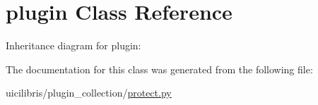 \hypertarget{classplugin}{\section{plugin \-Class \-Reference}
\label{classplugin}
}


\-Inheritance diagram for plugin\-:


\-The documentation for this class was generated from the following file\-:\begin{DoxyCompactItemize}
\item 
uicilibris/plugin\-\_\-collection/\hyperlink{protect_8py}{protect.\-py}\end{DoxyCompactItemize}

